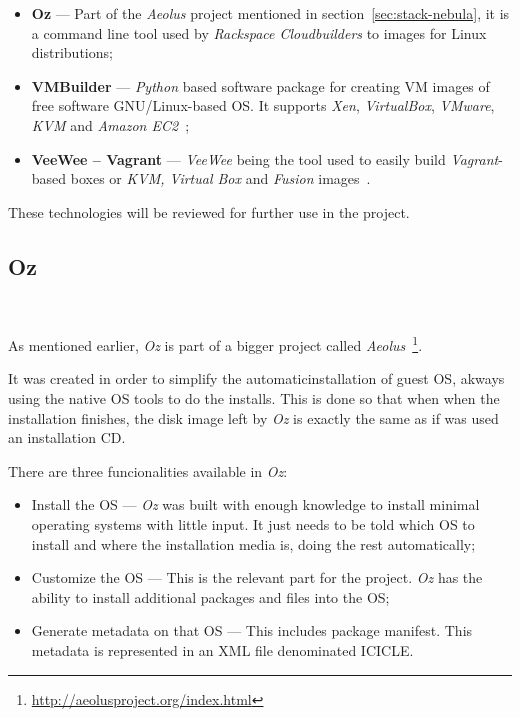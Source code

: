 \begin{itemize}
\item \textbf{Oz} --- Part of the \textit{Aeolus} project mentioned in section~\ref{sec:stack-nebula}, it is a command line tool used by \textit{Rackspace Cloudbuilders} to images for Linux distributions;
\item \textbf{VMBuilder} --- \textit{Python} based software package for creating VM images of free software GNU/Linux-based OS. It supports \textit{Xen}, \textit{VirtualBox}, \textit{VMware}, \textit{KVM} and \textit{Amazon EC2}~\cite{vmbuilder};
\item \textbf{VeeWee -- Vagrant} --- \textit{VeeWee} being the tool used to easily build \textit{Vagrant}-based boxes or \textit{KVM, Virtual Box} and \textit{Fusion} images~\cite{essex-doc-vms,veewee}.
\end{itemize}

These technologies will be reviewed for further use in the project.

\subsection{Oz}~\label{subsec:oz}

As mentioned earlier, \textit{Oz} is part of a bigger project called \textit{Aeolus}~\footnote{\url{http://aeolusproject.org/index.html}}.

It was created in order to simplify the automaticinstallation of guest OS, akways using the native OS tools to do the installs. This is done so that when when the installation finishes, the disk image left by \textit{Oz} is exactly the same as if was used an installation CD. 

There are three funcionalities available in \textit{Oz}:

\begin{itemize}
\item Install the OS --- \textit{Oz} was built with enough knowledge to install minimal operating systems with little input. It just needs to be told which OS to install and where the installation media is, doing the rest automatically;
\item Customize the OS --- This is the relevant part for the project. \textit{Oz} has the ability to install additional packages and files into the OS;
\item Generate metadata on that OS --- This includes package manifest. This metadata is represented in an XML file denominated ICICLE.
\end{itemize}

